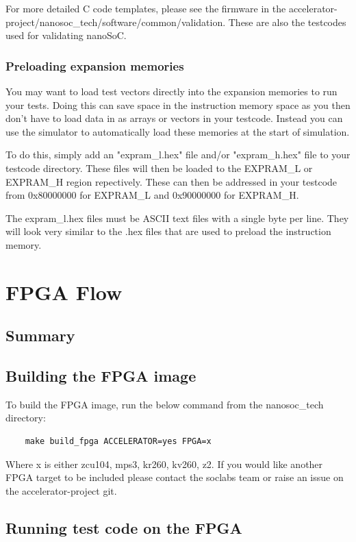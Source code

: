 \documentclass{report}
\begin{document}
For more detailed C code templates, please see the firmware in the 
accelerator-project/nanosoc\_tech/software/common/validation.
These are also the testcodes used for validating nanoSoC.

\subsection{Preloading expansion memories}
You may want to load test vectors directly into the expansion memories to run your tests. Doing this can save space in the 
instruction memory space as you then don't have to load data in as arrays or vectors in your testcode. Instead you can use the simulator
to automatically load these memories at the start of simulation.

To do this, simply add an "expram\_l.hex" file and/or "expram\_h.hex" file to your testcode directory. These files will then 
be loaded to the EXPRAM\_L or EXPRAM\_H region repectively. These can then be addressed in your testcode from 0x80000000 for EXPRAM\_L 
and 0x90000000 for EXPRAM\_H. 

The expram\_l.hex files must be ASCII text files with a single byte per line. They will look very similar to the .hex files that are used
to preload the instruction memory.


\chapter{FPGA Flow}
\section{Summary}

\section{Building the FPGA image}
To build the FPGA image, run the below command from the nanosoc\_tech directory:
\begin{lstlisting}
    make build_fpga ACCELERATOR=yes FPGA=x
\end{lstlisting}

Where x is either zcu104, mps3, kr260, kv260, z2. If you would like another FPGA target to be included
please contact the soclabs team or raise an issue on the accelerator-project git.

\section{Running test code on the FPGA}
\end{document}
